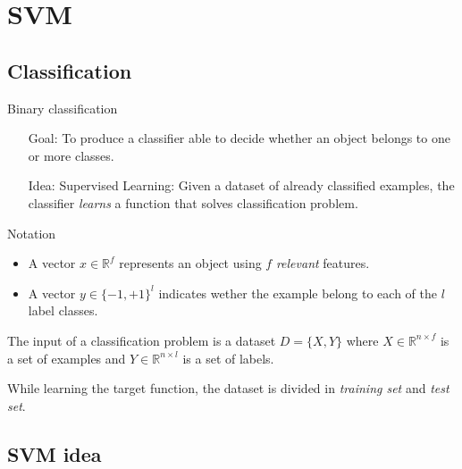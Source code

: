 \section{SVM}
\subsection{Classification}
\begin{frame}{Binary classification}
	\begin{itemize}\setlength\itemsep{1em}
		\item[Goal:] To produce a classifier able to decide whether an object belongs to one or more classes.
		\item[Idea:] Supervised Learning: Given a dataset of already classified examples, the classifier \textit{learns} a function that solves classification problem.
	\end{itemize}
\end{frame}

\begin{frame}{Notation}
	\begin{itemize}\setlength\itemsep{1em}
		\item A vector $x \in \mathbb{R}^f$ represents an object using $f$ \textit{relevant} features.
		\item A vector $y \in \{-1 , +1\}^l$ indicates wether the example belong to each of the $l$ label classes.
	\end{itemize}
	The input of a classification problem is a dataset $D = \{X, Y\}$ where $X \in \mathbb{R}^{n\times f}$ is a set of examples and $Y \in \mathbb{R}^{n\times l}$ is a set of labels.
	
	While learning the target function, the dataset is divided in \textit{training set} and \textit{test set}.
\end{frame}

\subsection{SVM idea}

